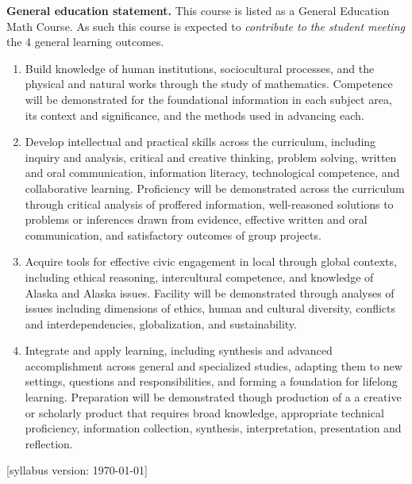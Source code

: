 \documentclass[12pt]{article}
\renewcommand{\emph}[1]{\textsf{\textbf{#1}}}
\begin{document}
\emph{General education statement.}  This course is listed as a General Education Math Course.  As such this course is expected to \textsl{contribute to the student meeting}
the 4 general learning outcomes.
\vskip -20pt

\begin{enumerate}
\item Build knowledge of human institutions, sociocultural processes, and the physical and natural works through the study of mathematics.  Competence will be demonstrated for the foundational information in each subject area, its context and significance, and the methods used in advancing each.

\item Develop intellectual and practical skills across the curriculum, including inquiry and analysis, critical and creative thinking, problem solving, written and oral communication, information literacy, technological competence, and collaborative learning. Proficiency will be demonstrated across the curriculum through critical analysis of proffered information, well-reasoned solutions to problems or inferences drawn from evidence, effective written and oral communication, and satisfactory outcomes of group projects.

\item Acquire tools for effective civic engagement in local through global contexts, including ethical reasoning, intercultural competence, and knowledge of Alaska and Alaska issues.  Facility will be demonstrated through analyses of issues including dimensions of ethics, human and cultural diversity, conflicts and interdependencies, globalization, and sustainability.   

\item Integrate and apply learning, including synthesis and advanced accomplishment across general and specialized studies, adapting them to new settings, questions and responsibilities, and forming a foundation for lifelong learning. Preparation will be demonstrated though production of a a creative or scholarly product that requires broad knowledge, appropriate technical proficiency, information collection, synthesis, interpretation, presentation and reflection.
\end{enumerate}

\hfill  \scriptsize [syllabus version: \today] \normalsize
\end{document}
